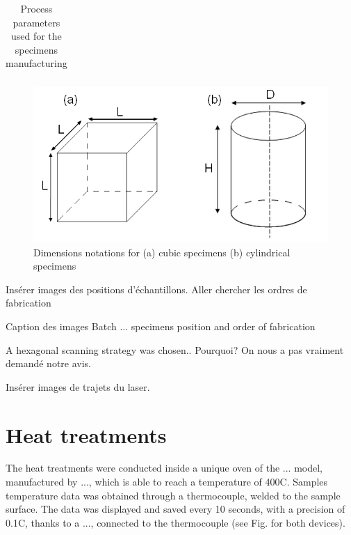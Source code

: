 \begin{table}[ht]
{\begin{tabular}{|c|c|c |c |c|c|c|}
    \hline

\end{tabular}}
\caption[Process parameters used for the specimens manufacturing]{Process parameters used for the specimens manufacturing}
\label{table:Pparam}
\end{table}
 
\begin{figure}[th]
\centering
\includegraphics[scale=0.58]{Images/cc}
\caption[Dimensions notations for (a) cubic specimens (b) cylindrical specimens]{Dimensions notations for (a) cubic specimens (b) cylindrical specimens}
\label{fig:cc}
\end{figure}

Insérer images des positions d'échantillons. Aller chercher les ordres de fabrication

Caption des images Batch ... specimens position and order of fabrication

A hexagonal scanning strategy was chosen.. Pourquoi? On nous a pas vraiment demandé notre avis.

Insérer images de trajets du laser.

\section{Heat treatments}

The heat treatments were conducted inside a unique oven of the ... model, manufactured by ..., which is able to reach a temperature of 400\degree C. Samples temperature data was obtained through a thermocouple, welded to the sample surface. The data was displayed and saved every 10 seconds, with a precision of 0.1\degree C, thanks to a ..., connected to the thermocouple (see Fig. for both devices). \\

